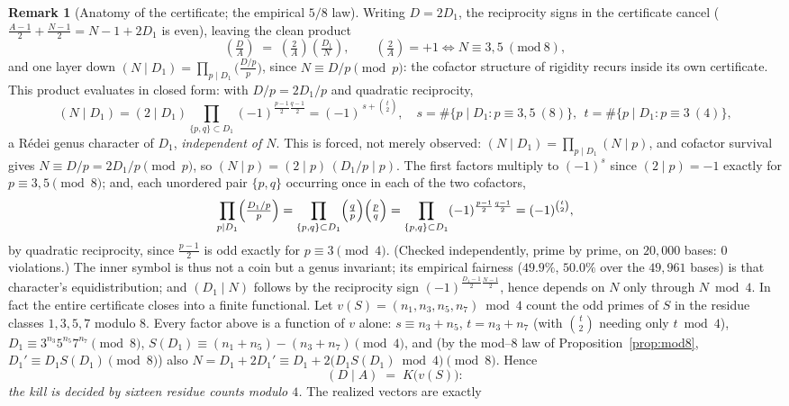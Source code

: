 \documentclass[11pt]{article}
\theoremstyle{definition}
\newtheorem{remark}[theorem]{Remark}
\begin{document}
\begin{remark}[Anatomy of the certificate; the empirical $5/8$ law]\label{rem:fiveeighths}
Writing $D=2D_1$, the reciprocity signs in the certificate cancel
\textup{(}$\tfrac{A-1}2+\tfrac{N-1}2=N-1+2D_1$ is even\textup{)}, leaving the clean product
\[ \left(\tfrac{D}{A}\right)\;=\;\left(\tfrac{2}{A}\right)\left(\tfrac{D_1}{N}\right),\qquad
\left(\tfrac{2}{A}\right)=+1\iff N\equiv3,5\ (\mathrm{mod}\ 8), \]
and one layer down $(N\mid D_1)=\prod_{p\mid D_1}\bigl(\tfrac{D/p}{p}\bigr)$, since
$N\equiv D/p\pmod p$: the cofactor structure of rigidity recurs inside its own certificate. This product evaluates in closed form: with $D/p=2D_1/p$ and quadratic
reciprocity,
\[ (N\mid D_1)=(2\mid D_1)\!\!\prod_{\{p,q\}\subset D_1}\!\!(-1)^{\frac{p-1}2\frac{q-1}2}
=(-1)^{\,s+\binom{t}{2}},\quad s=\#\{p\mid D_1:p\equiv3,5\ (8)\},\ \ t=\#\{p\mid D_1:p\equiv3\ (4)\}, \]
a R\'edei genus character of $D_1$, \emph{independent of $N$}. This is forced, not merely observed:
$(N\mid D_1)=\prod_{p\mid D_1}(N\mid p)$, and cofactor survival gives $N\equiv D/p=2D_1/p\pmod p$, so
$(N\mid p)=(2\mid p)\,(D_1/p\mid p)$. The first factors multiply to $(-1)^{s}$ since $(2\mid p)=-1$
exactly for $p\equiv3,5\pmod 8$; and, each unordered pair $\{p,q\}$ occurring once in each of the two
cofactors,
\[ \prod_{p\mid D_1}\Bigl(\tfrac{D_1/p}{p}\Bigr)=\prod_{\{p,q\}\subset D_1}\Bigl(\tfrac qp\Bigr)
\Bigl(\tfrac pq\Bigr)=\prod_{\{p,q\}\subset D_1}(-1)^{\frac{p-1}2\frac{q-1}2}=(-1)^{\binom t2}, \]
by quadratic reciprocity, since $\tfrac{p-1}2$ is odd exactly for $p\equiv3\pmod4$. (Checked
independently, prime by prime, on $20{,}000$ bases: $0$ violations.) The inner symbol is thus not a coin but a genus invariant; its empirical fairness
($49.9\%$, $50.0\%$ over the $49{,}961$ bases) is that character's equidistribution; and
$(D_1\mid N)$ follows by the reciprocity sign $(-1)^{\frac{D_1-1}2\frac{N-1}2}$, hence depends on $N$
only through $N\bmod4$. In fact the entire certificate closes into a finite functional. Let
$v(S)=(n_1,n_3,n_5,n_7)\bmod4$ count the odd primes of $S$ in the residue classes $1,3,5,7$ modulo
$8$. Every factor above is a function of $v$ alone: $s\equiv n_3+n_5$, $t=n_3+n_7$ (with
$\binom t2$ needing only $t\bmod4$), $D_1\equiv3^{n_3}5^{n_5}7^{n_7}\pmod8$,
$S(D_1)\equiv(n_1+n_5)-(n_3+n_7)\pmod4$, and (by the mod--$8$ law of
Proposition~\ref{prop:mod8}, $D_1'\equiv D_1S(D_1)\pmod8$) also
$N=D_1+2D_1'\equiv D_1+2\bigl(D_1S(D_1)\bmod4\bigr)\pmod8$. Hence
\[ (D\mid A)\;=\;K\bigl(v(S)\bigr): \]
\emph{the kill is decided by sixteen residue counts modulo $4$.} The realized vectors are exactly

\end{remark}
\end{document}
